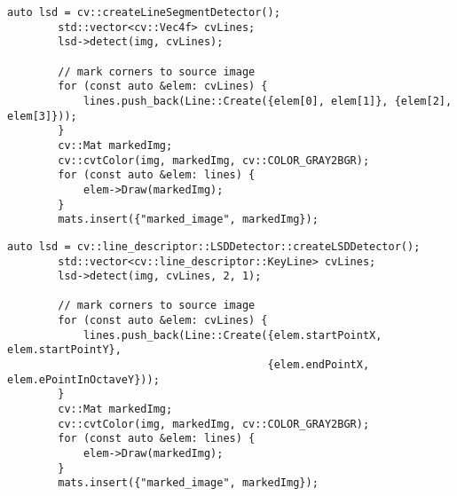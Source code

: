 \documentclass[12pt, onecolumn]{article}
\newcommand\normf{\fangsong}
\begin{document}
	\begin{lstlisting}[caption={\normf LSD1直线提取代码}]
	    auto lsd = cv::createLineSegmentDetector();
	    std::vector<cv::Vec4f> cvLines;
	    lsd->detect(img, cvLines);
	
	    // mark corners to source image
	    for (const auto &elem: cvLines) {
	        lines.push_back(Line::Create({elem[0], elem[1]}, {elem[2], elem[3]}));
	    }
	    cv::Mat markedImg;
	    cv::cvtColor(img, markedImg, cv::COLOR_GRAY2BGR);
	    for (const auto &elem: lines) {
	        elem->Draw(markedImg);
	    }
	    mats.insert({"marked_image", markedImg});
	\end{lstlisting}
	\begin{lstlisting}[caption={\normf LSD2直线提取代码}]
	    auto lsd = cv::line_descriptor::LSDDetector::createLSDDetector();
	    std::vector<cv::line_descriptor::KeyLine> cvLines;
	    lsd->detect(img, cvLines, 2, 1);
	
	    // mark corners to source image
	    for (const auto &elem: cvLines) {
	        lines.push_back(Line::Create({elem.startPointX, elem.startPointY},
	                                     {elem.endPointX, elem.ePointInOctaveY}));
	    }
	    cv::Mat markedImg;
	    cv::cvtColor(img, markedImg, cv::COLOR_GRAY2BGR);
	    for (const auto &elem: lines) {
	        elem->Draw(markedImg);
	    }
	    mats.insert({"marked_image", markedImg});
	\end{lstlisting}
\end{document}
